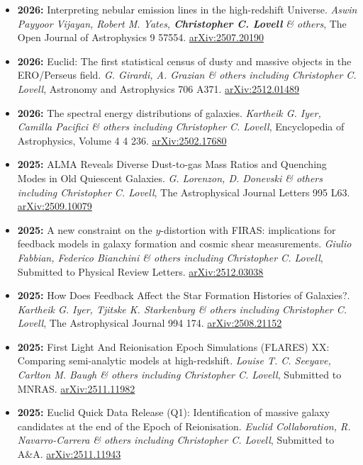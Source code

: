 \begin{itemize}
\item \textbf{2026:} Interpreting nebular emission lines in the high-redshift Universe. \textit{Aswin Payyoor Vijayan, Robert M. Yates, \textbf{Christopher C. Lovell} \& others}, The Open Journal of Astrophysics 9 57554. \href{https://arxiv.org/abs/2507.20190}{arXiv:2507.20190}
\item \textbf{2026:} Euclid: The first statistical census of dusty and massive objects in the ERO/Perseus field. \textit{G. Girardi, A. Grazian \& others including Christopher C. Lovell}, Astronomy and Astrophysics 706 A371. \href{https://arxiv.org/abs/2512.01489}{arXiv:2512.01489}
\item \textbf{2026:} The spectral energy distributions of galaxies. \textit{Kartheik G. Iyer, Camilla Pacifici \& others including Christopher C. Lovell}, Encyclopedia of Astrophysics, Volume 4 4 236. \href{https://arxiv.org/abs/2502.17680}{arXiv:2502.17680}
\item \textbf{2025:} ALMA Reveals Diverse Dust-to-gas Mass Ratios and Quenching Modes in Old Quiescent Galaxies. \textit{G. Lorenzon, D. Donevski \& others including Christopher C. Lovell}, The Astrophysical Journal Letters 995 L63. \href{https://arxiv.org/abs/2509.10079}{arXiv:2509.10079}
\item \textbf{2025:} A new constraint on the $y$-distortion with FIRAS: implications for feedback models in galaxy formation and cosmic shear measurements. \textit{Giulio Fabbian, Federico Bianchini \& others including Christopher C. Lovell}, Submitted to Physical Review Letters. \href{https://arxiv.org/abs/2512.03038}{arXiv:2512.03038}
\item \textbf{2025:} How Does Feedback Affect the Star Formation Histories of Galaxies?. \textit{Kartheik G. Iyer, Tjitske K. Starkenburg \& others including Christopher C. Lovell}, The Astrophysical Journal 994 174. \href{https://arxiv.org/abs/2508.21152}{arXiv:2508.21152}
\item \textbf{2025:} First Light And Reionisation Epoch Simulations (FLARES) XX: Comparing semi-analytic models at high-redshift. \textit{Louise T. C. Seeyave, Carlton M. Baugh \& others including Christopher C. Lovell}, Submitted to MNRAS. \href{https://arxiv.org/abs/2511.11982}{arXiv:2511.11982}
\item \textbf{2025:} Euclid Quick Data Release (Q1): Identification of massive galaxy candidates at the end of the Epoch of Reionisation. \textit{Euclid Collaboration, R. Navarro-Carrera \& others including Christopher C. Lovell}, Submitted to A\&A. \href{https://arxiv.org/abs/2511.11943}{arXiv:2511.11943}

\end{itemize}
